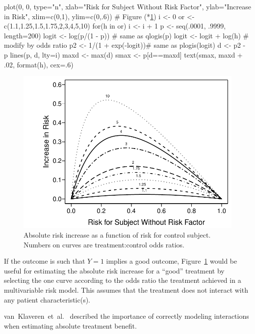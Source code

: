 \begin{Schunk}
\begin{Sinput}
plot(0, 0, type="n", xlab="Risk for Subject Without Risk Factor",
     ylab="Increase in Risk",
     xlim=c(0,1), ylim=c(0,.6))   # Figure (*\ref{fig:ancova-or-diff}\ipacue*)
i <- 0
or <- c(1.1,1.25,1.5,1.75,2,3,4,5,10)
for(h in or) {
  i <- i + 1
  p <- seq(.0001, .9999, length=200)
  logit <- log(p/(1 - p))  # same as qlogis(p)
  logit <- logit + log(h)  # modify by odds ratio
  p2 <- 1/(1 + exp(-logit))# same as plogis(logit)
  d <- p2 - p
  lines(p, d, lty=i)
  maxd <- max(d)
  smax <- p[d==maxd]
  text(smax, maxd + .02, format(h), cex=.6)
}
\end{Sinput}
\begin{figure}[htbp]

\centerline{\includegraphics[width=\maxwidth]{ancova-or-diff-1} }

\caption[Absolute risk increase as a function of risk]{Absolute risk increase as a function of risk for control subject.  Numbers on curves are treatment:control odds ratios.}\label{fig:ancova-or-diff}
\end{figure}
\end{Schunk}
If the outcome is such that $Y=1$ implies a good outcome,
Figure~\ref{fig:ancova-or-diff} would be useful for estimating the
absolute risk increase for a ``good'' treatment by selecting the one
curve according to the odds ratio the treatment achieved in a
multivariable risk model.  This assumes that the treatment does not
interact with any patient characteristic(s).

van~Klaveren~et~al.~\cite{kla15est} described the importance of correctly modeling interactions when estimating absolute treatment benefit.


